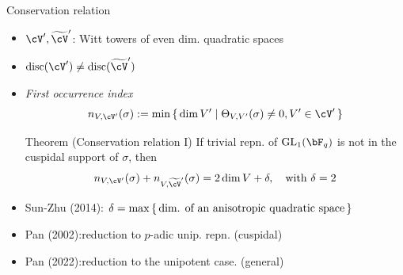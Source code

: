 \documentclass[t,mathserif,11pt,usenames,dvipsnames]{beamer}
\theoremstyle{plain}
\theoremstyle{definition}
\def\GL{\mathrm{GL}}
\def\Ind{{\rm Ind}}
\def\blue{\color{blue}}
\let\oldemph\emph
\def\emph#1{\oldemph{\blue #1}}
\begin{document}
\begin{frame}{Conservation relation}
  \begin{itemize}
    \item $\cV', \wtcV'$: Witt towers of even dim. quadratic spaces
    \item[] \hfill$\mathrm{disc} (\cV') \neq \mathrm{disc}(\wtcV')$\hfill\ \pause
    \item \emph{First occurrence index} \vspace{-.5em}
          \[
          n_{V,\cV'}(\sigma) := \min \set{\dim V'| \Theta_{V,V'}(\sigma)\neq 0, V'\in \cV' }
          \]\pause
          \vspace{-2em}

  \begin{block}{Theorem (Conservation relation I)}
    If trivial repn. of $\GL_{1}(\bF_{q})$ is not in the cuspidal support of $\sigma$, then
    \[
      n_{V,\cV'}(\sigma) + n_{V, \wtcV'}(\sigma) = 2\dim V + \delta, \quad \text{with
      }\delta=2
    \]
  \end{block}\pause
  \item Sun-Zhu (2014): $ \delta=\max\set{\text{dim. of an anisotropic quadratic
          space}}$ \pause
  \item Pan (2002):reduction to $p$-adic unip. repn. (cuspidal)
  \item Pan (2022):reduction to the unipotent  case. (general)
  \end{itemize}
\end{frame}
\end{document}
